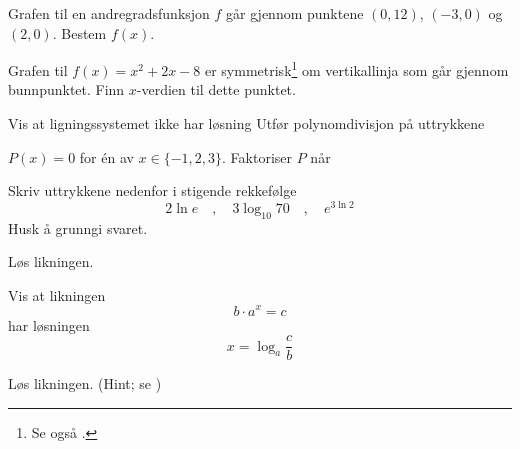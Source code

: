 Grafen til en andregradsfunksjon $ f $ går gjennom punktene $ (0, 12) $, $ (-3, 0) $ og $ (2, 0) $. Bestem $ f(x) $.

Grafen til $ {f(x)=x^2+2x-8} $ er symmetrisk\footnote{Se også .} om vertikallinja som går gjennom bunnpunktet. Finn $ x $-verdien til dette punktet.

 \vs \vs
{}
Vis at ligningssystemet ikke har løsning
\nes
{}
Utfør polynomdivisjon på uttrykkene \os
{}

\newpage
\nes

$ P(x)=0 $ for én av $ x\in\{-1, 2, 3\} $.
Faktoriser $ P $ når

\nes

Skriv uttrykkene nedenfor i stigende rekkefølge
\[ 2\ln e\quad,\quad3\log_{10} 70\quad,\quad e^{3\ln 2} \]
Husk å grunngi svaret.\os



Løs likningen. \os
{}


Vis at likningen 
\[ b\cdot a^x =c \]
har løsningen
\[ x=\log_a\frac{c}{b} \]

Løs likningen. (Hint; se )\os

 \os
{}

